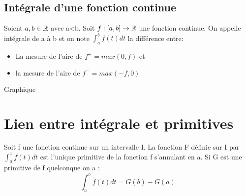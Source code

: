 \subsection{Intégrale d'une fonction continue}
\begin{mydef}
  Soient $a,b \in \mathbb{R}$ avec a<b. Soit $f:[a,b] \to \mathbb{R}$  une fonction
  continue. On appelle intégrale de a à b et on note
  $\int_a^b f(t) dt$ la différence entre:
  \begin{itemize}[label=$\bullet$, leftmargin=2cm]
  \item La mesure de l'aire de $f^+=max(0,f)$ et
  \item la mesure de l'aire de $f^-=max(-f,0)$
  \end{itemize}
\end{mydef}

\note Graphique
\section{Lien entre intégrale et primitives}
\begin{theo}
  Soit f une fonction continue sur un intervalle I. La fonction F
  définie sur I par $\int_a^x f(t) dt$ est l'unique primitive de la fonction
  f s'annulant en a. Si G est une primitive de f quelconque on a :
  \[
    \int_a^b f(t) dt = G(b) - G(a)
  \]
\end{theo}

